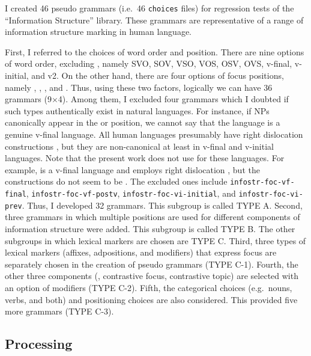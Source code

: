 I created 46 pseudo grammars (i.e.\ 46 \texttt{choices} files) for regression
tests of the ``Information Structure'' library.
These grammars are representative of a range of information structure
marking in human language.



First, I referred to the choices of word order and 
position. There are nine options of word order, excluding , namely SVO, SOV, VSO, VOS, OSV, OVS, v-final,
v-initial, and v2. On the other hand, there are four options of focus
positions, namely , ,
, and . Thus, using these two factors,
logically we can have 36 grammars (9\ensuremath{\times}4). Among
them, I excluded four grammars which I doubted if such types
authentically exist in natural languages. For instance, if NPs
canonically appear in the  or 
position, we cannot say that the language is a genuine v-final
language. All human languages presumably have right dislocation
constructions \citep{lambrecht:96}, but they are non-canonical at
least in v-final and v-initial languages. Note that the present work
does not use  for these languages.  For
example,  is a v-final language and employs right
dislocation \citep{kim:11}, but the constructions do not seem to be
. The excluded ones include
\texttt{infostr-foc-vf-final}, \texttt{infostr-foc-vf-postv},
\texttt{infostr-foc-vi-initial}, and \texttt{infostr-foc-vi-prev}.
Thus, I developed 32 grammars. This subgroup is called TYPE A.
Second, three grammars in which multiple positions are used for
different components of information structure were added.  This
subgroup is called TYPE B.  The other subgroups in which lexical
markers are chosen are TYPE C. Third, three types
of lexical markers (affixes, adpositions, and modifiers) that express
focus are separately chosen in the creation of pseudo grammars (TYPE
C-1). Fourth, the other three components (,
contrastive focus, contrastive topic) are selected with an option of
modifiers (TYPE C-2).  Fifth, the categorical choices (e.g.\ nouns,
verbs, and both) and positioning choices are also considered. This
provided five more grammars (TYPE C-3).


\subsection{Processing}
\label{13:ssec:testing}

